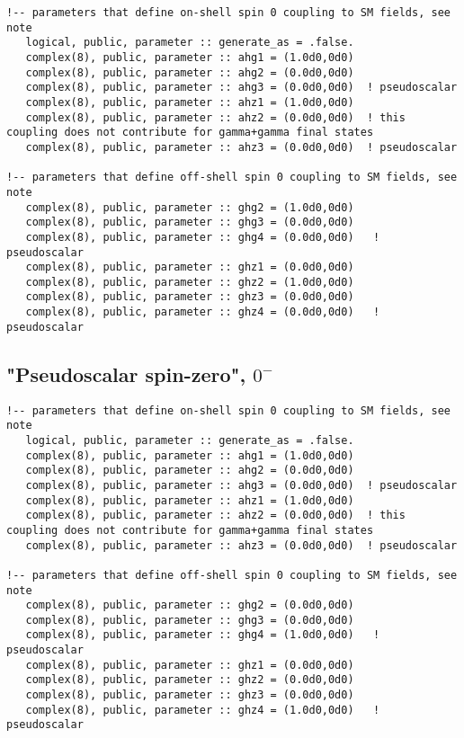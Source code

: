 \documentclass[aps,superscriptaddress,nofootinbib]{revtex4}
\begin{document}
\footnotesize
\begin{verbatim}
!-- parameters that define on-shell spin 0 coupling to SM fields, see note
   logical, public, parameter :: generate_as = .false.
   complex(8), public, parameter :: ahg1 = (1.0d0,0d0)
   complex(8), public, parameter :: ahg2 = (0.0d0,0d0)
   complex(8), public, parameter :: ahg3 = (0.0d0,0d0)  ! pseudoscalar
   complex(8), public, parameter :: ahz1 = (1.0d0,0d0)
   complex(8), public, parameter :: ahz2 = (0.0d0,0d0)  ! this coupling does not contribute for gamma+gamma final states
   complex(8), public, parameter :: ahz3 = (0.0d0,0d0)  ! pseudoscalar

!-- parameters that define off-shell spin 0 coupling to SM fields, see note
   complex(8), public, parameter :: ghg2 = (1.0d0,0d0)
   complex(8), public, parameter :: ghg3 = (0.0d0,0d0)
   complex(8), public, parameter :: ghg4 = (0.0d0,0d0)   ! pseudoscalar
   complex(8), public, parameter :: ghz1 = (0.0d0,0d0)
   complex(8), public, parameter :: ghz2 = (1.0d0,0d0)
   complex(8), public, parameter :: ghz3 = (0.0d0,0d0)
   complex(8), public, parameter :: ghz4 = (0.0d0,0d0)   ! pseudoscalar
\end{verbatim}
\normalsize

\subsection{"Pseudoscalar spin-zero", $0^-$}

\footnotesize
\begin{verbatim}
!-- parameters that define on-shell spin 0 coupling to SM fields, see note
   logical, public, parameter :: generate_as = .false.
   complex(8), public, parameter :: ahg1 = (1.0d0,0d0)
   complex(8), public, parameter :: ahg2 = (0.0d0,0d0)
   complex(8), public, parameter :: ahg3 = (0.0d0,0d0)  ! pseudoscalar
   complex(8), public, parameter :: ahz1 = (1.0d0,0d0)
   complex(8), public, parameter :: ahz2 = (0.0d0,0d0)  ! this coupling does not contribute for gamma+gamma final states
   complex(8), public, parameter :: ahz3 = (0.0d0,0d0)  ! pseudoscalar

!-- parameters that define off-shell spin 0 coupling to SM fields, see note
   complex(8), public, parameter :: ghg2 = (0.0d0,0d0)
   complex(8), public, parameter :: ghg3 = (0.0d0,0d0)
   complex(8), public, parameter :: ghg4 = (1.0d0,0d0)   ! pseudoscalar
   complex(8), public, parameter :: ghz1 = (0.0d0,0d0)
   complex(8), public, parameter :: ghz2 = (0.0d0,0d0)
   complex(8), public, parameter :: ghz3 = (0.0d0,0d0)
   complex(8), public, parameter :: ghz4 = (1.0d0,0d0)   ! pseudoscalar
\end{verbatim}
\normalsize
\end{document}
